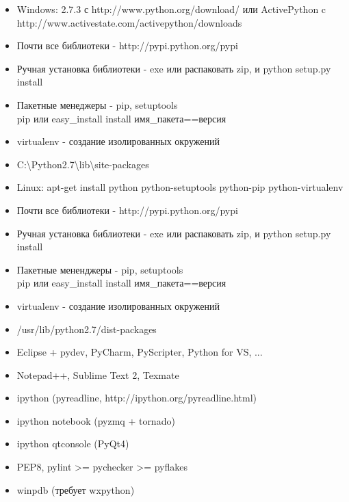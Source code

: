 \documentclass{article}
\begin{document}
\begin{itemize}
    \item Windows: 2.7.3 с http://www.python.org/download/ 
    или ActivePython c http://www.activestate.com/activepython/downloads
    \item Почти все библиотеки - http://pypi.python.org/pypi
    \item Ручная установка библиотеки - exe или распаковать zip, и python setup.py install
    \item Пакетные менеджеры - pip, setuptools \\
    	pip или easy\_install install имя\_пакета==версия
    \item virtualenv - создание изолированных окружений
    \item C:{\textbackslash}Python2.7{\textbackslash}lib{\textbackslash}site-packages
\end{itemize}
\newpage

\begin{itemize}
    \item Linux: apt-get install python python-setuptools python-pip python-virtualenv
    \item Почти все библиотеки - http://pypi.python.org/pypi
    \item Ручная установка библиотеки - exe или распаковать zip, и python setup.py install
    \item Пакетные мененджеры - pip, setuptools \\
        pip или easy\_install install имя\_пакета==версия
    \item virtualenv - создание изолированных окружений
    \item /usr/lib/python2.7/dist-packages
\end{itemize}
\newpage

\begin{itemize}
    \item Eclipse + pydev, PyCharm, PyScripter, Python for VS, ...
    \item Notepad++, Sublime Text 2, Texmate
    \item ipython (pyreadline, http://ipython.org/pyreadline.html)
    \item ipython notebook (pyzmq + tornado)
    \item ipython qtconsole (PyQt4)
    \item PEP8, pylint >= pychecker >= pyflakes
    \item winpdb (требует wxpython)
\end{itemize}
\newpage
\end{document}
